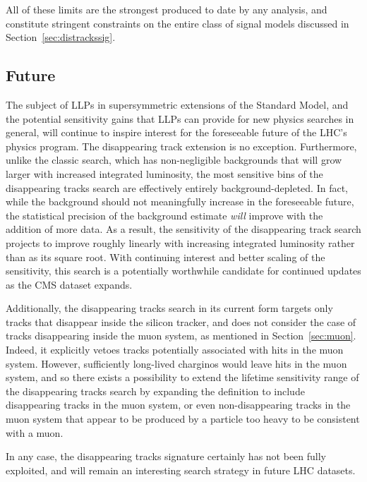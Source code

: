   All of these limits are the strongest produced to date by any analysis, and constitute stringent constraints on the entire class of signal models discussed in Section~\ref{sec:distrackssig}.

  \subsection{Future} \label{sec:distracksfuture}
  
  The subject of LLPs in supersymmetric extensions of the Standard Model, and the potential sensitivity gains that LLPs can provide for new physics searches in general, will continue to inspire interest for the foreseeable future of the LHC's physics program.
  The \mttwo disappearing track extension is no exception.
  Furthermore, unlike the classic search, which has non-negligible backgrounds that will grow larger with increased integrated luminosity, the most sensitive bins of the disappearing tracks search are effectively entirely background-depleted.
  In fact, while the background should not meaningfully increase in the foreseeable future, the statistical precision of the background estimate {\it will} improve with the addition of more data.
  As a result, the sensitivity of the disappearing track search projects to improve roughly linearly with increasing integrated luminosity rather than as its square root.
  With continuing interest and better scaling of the sensitivity, this search is a potentially worthwhile candidate for continued updates as the CMS dataset expands.

  Additionally, the disappearing tracks search in its current form targets only tracks that disappear inside the silicon tracker, and does not consider the case of tracks disappearing inside the muon system, as mentioned in Section~\ref{sec:muon}.
  Indeed, it explicitly vetoes tracks potentially associated with hits in the muon system.
  However, sufficiently long-lived charginos would leave hits in the muon system, and so there exists a possibility to extend the lifetime sensitivity range of the disappearing tracks search by expanding the definition to include disappearing tracks in the muon system, or even non-disappearing tracks in the muon system that appear to be produced by a particle too heavy to be consistent with a muon.

  In any case, the disappearing tracks signature certainly has not been fully exploited, and will remain an interesting search strategy in future LHC datasets.


